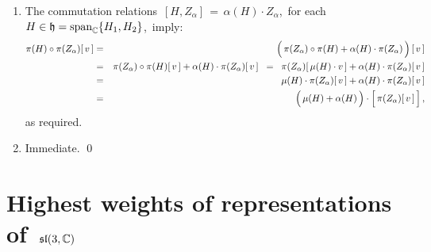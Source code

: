 \begin{enumerate}
\item
    The commutation relations
    \,$[H,Z_{\alpha}] \,=\, \alpha(H) \cdot Z_{\alpha}$,\,
    for each \,$H \in \mathfrak{h} = \textnormal{span}_{\mathbb{C}}\{H_{1},H_{2}\}$,\,
    imply:
    \begin{eqnarray*}
    \pi(H) \circ \pi(Z_{\alpha})[\,v\,]
    & = &
        \left(\,
            \overset{{\color{white}.}}{
                \pi(Z_{\alpha}) \circ \pi(H) + \alpha(H)\cdot\pi(Z_{\alpha})
                }
            \,\right)[\,v\,]
    \\
    & = &
        \pi(Z_{\alpha}) \circ \pi(H)[\,v\,] + \alpha(H)\cdot\pi(Z_{\alpha})[\,v\,]
    \;\; = \;\;
        \pi(Z_{\alpha})[\,\mu(H) \cdot v\,] + \alpha(H)\cdot\pi(Z_{\alpha})[\,v\,]
    \\
    & = &
        \mu(H) \cdot \pi(Z_{\alpha})[\,v\,] + \alpha(H)\cdot\pi(Z_{\alpha})[\,v\,]
    \\
    & = &
        \left(\,
            \overset{{\color{white}.}}{
                \mu(H) + \alpha(H)
                }
            \,\right)
        \cdot
        \left[\,\overset{{\color{white}.}}{\pi(Z_{\alpha})[\,v\,]}\,\right],
    \end{eqnarray*}
    as required.
\item
    Immediate.
    \qed
\end{enumerate}


\vskip 0.5cm
\section{Highest weights of representations of \,$\mathfrak{sl}(3,\mathbb{C})$}


